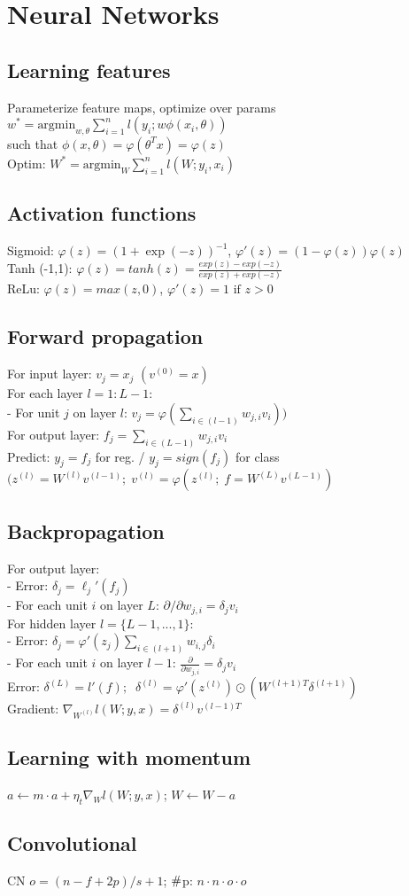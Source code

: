 \section*{\normalsize{Neural Networks}}
\subsection*{Learning features}
Parameterize feature maps, optimize over params\\
$w^* = \text{argmin}_{w, \theta} \sum_{i=1}^n l(y_i; w \phi(x_i, \theta))$\\
such that $\phi(x,\theta) = \varphi(\theta^T x) = \varphi(z)$ \\
Optim: $W^* = \text{argmin}_W \sum_{i=1}^{n} l(W;y_i,x_i) $

\subsection*{Activation functions}
Sigmoid: $\varphi(z) = (1+\exp(-z))^{-1}$, $ \varphi'(z)=(1-\varphi(z))\varphi(z)$\\
Tanh (-1,1): $\varphi(z) = tanh(z) = \frac{exp(z)-exp(-z)}{exp(z)+exp(-z)}$\\
ReLu:  $\varphi(z) = max(z,0)$, $\varphi'(z)=1 \text{  if } z>0 $ 

\subsection*{Forward propagation}
For input layer: $v_j=x_j$ $(v^{(0)}=x)$\\
For each layer $l=1:L-1$:\\
- For unit $j$ on layer $l$: $v_j = \varphi(\sum_{i\in (l-1)} w_{j,i}v_i))$\\
For output layer: $f_j = \sum_{i\in (L-1)} w_{j,i}v_i $\\ 
Predict: $y_j = f_j$ for reg. / $y_j = sign(f_j)$ for class\\
$(z^{(l)}=W^{(l)}v^{(l-1)}; \; v^{(l)}=\varphi(z^{(l)}; \; f=W^{(L)}v^{(L-1)})$

\subsection*{Backpropagation}
For output layer: \\
- Error: $\delta_j = \ell_j'(f_j) \quad $\\
- For each unit $i$ on layer $L$: $\partial / \partial w_{j,i} = \delta_j v_i$\\
For hidden layer $l=\{L-1,...,1\}$:\\
- Error: $\delta_j = \varphi'(z_j) \sum_{i\in(l+1)} w_{i,j}\delta_i$\\
- For each unit $i$ on layer $l-1$: $\frac{\partial}{\partial w_{j,i}} = \delta_j v_i$\\
Error: $\delta^{(L)}=l'(f); \; \; \delta	^{(l)} =\varphi'(z^{(l)})\odot( W^{(l+1)T}\delta^{(l+1)} )$\\
Gradient: $\nabla_{W^{(l)}} l(W;y,x)=\delta^{(l)}v^{(l-1)T} $

\subsection*{Learning with momentum}
$a \leftarrow m \cdot a + \eta_t \nabla_W l(W;y,x)$; $W \leftarrow W - a$
\subsection*{Convolutional}
CN $o=(n-f+2p)/s +1$; $\color{black}{\#}$p: $ n\cdot n \cdot o \cdot o$ 